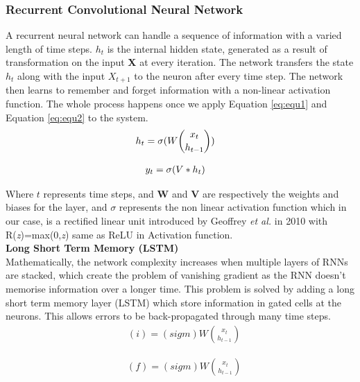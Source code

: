 \documentclass{vldb}
\begin{document}
\subsubsection{Recurrent Convolutional Neural Network} \label{ewlu}
A recurrent neural network can handle a sequence of information with a varied length of time steps. \textbf{$h_{t}$} is the internal hidden state, generated as a result of transformation on the input \textbf{X} at every iteration. The network transfers the state \textbf{$h_{t}$} along with the input \textbf{$X_{t+1}$} to the neuron after every time step. The network then learns to remember and forget information with a non-linear activation function. The whole process happens once we apply Equation \ref{eq:equ1} and Equation \ref{eq:equ2} to the system.
\begin{align}
\label{eq:equ1}
   &\large h_{t}=\sigma (W\binom{x_{t}}{h_{t-1}})
\end{align}

\begin{align}
\label{eq:equ2}
   &\large y_{t}=\sigma (V*h_{t})
\end{align}

Where $\textit{t}$ represents time steps, and \textbf{W} and \textbf{V} are respectively the weights and biases for the layer, and $\sigma$ represents the non linear activation function which in our case, is a rectified linear unit introduced by Geoffrey \textit{et al.} in 2010 \cite{nair2010rectified} with R(\textit{z})=max(0,\textit{z}) same as ReLU in Activation function.\\

\textbf{Long Short Term Memory (LSTM)}\\

Mathematically, the network complexity increases when multiple layers of RNNs are stacked, which create the problem of vanishing gradient as the RNN doesn't memorise information over a longer time. This problem is solved by adding a long short term memory layer (LSTM) \cite{hochreiter1997long} which store information in gated cells at the neurons. This allows errors to be back-propagated through many time steps.
\begin{align}
   & \left ( i \right ) = \left ( sigm \right ) W\binom{x_{t}}{h_{t-1}}
\end{align}

\begin{align}
   & \left ( f \right ) = \left ( sigm \right ) W\binom{x_{t}}{h_{t-1}}
\end{align}
\end{document}
